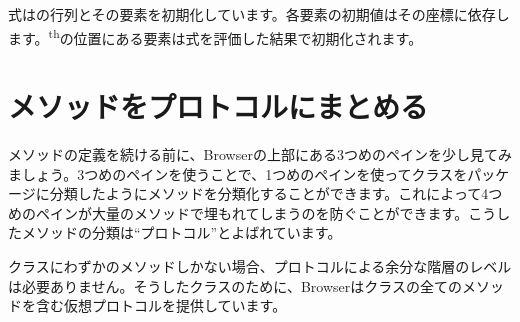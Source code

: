 \documentclass[a4paper,10pt,twoside]{book}
\begin{document}

式はの行列とその要素を初期化しています。各要素の初期値はその座標に依存します。\textsuperscript{th}の位置にある要素は式を評価した結果で初期化されます。





\section{メソッドをプロトコルにまとめる}

メソッドの定義を続ける前に、Browserの上部にある3つめのペインを少し見てみましょう。3つめのペインを使うことで、1つめのペインを使ってクラスをパッケージに分類したようにメソッドを分類化することができます。これによって4つめのペインが大量のメソッドで埋もれてしまうのを防ぐことができます。こうしたメソッドの分類は``プロトコル''とよばれています。


クラスにわずかのメソッドしかない場合、プロトコルによる余分な階層のレベルは必要ありません。そうしたクラスのために、Browserはクラスの全てのメソッドを含む仮想プロトコルを提供しています。
\end{document}
